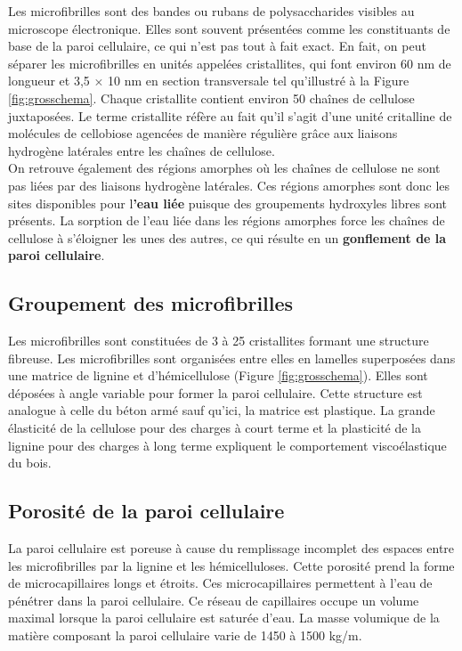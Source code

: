 Les microfibrilles sont des bandes ou rubans de polysaccharides visibles au microscope électronique. Elles sont souvent présentées comme les constituants de base de la paroi cellulaire, ce qui n'est pas tout à fait exact. En fait, on peut séparer les microfibrilles en unités appelées cristallites, qui font environ 60 nm de longueur et 3,5 $\times$ 10 nm en section transversale tel qu'illustré à la Figure \ref{fig:grosschema}. Chaque cristallite contient environ 50 chaînes de cellulose juxtaposées. Le terme cristallite réfère au fait qu'il s'agit d'une unité critalline de molécules de cellobiose agencées de manière régulière grâce aux liaisons hydrogène latérales entre les chaînes de cellulose.\\

On retrouve également des régions amorphes où les chaînes de cellulose ne sont pas liées par des liaisons hydrogène latérales. Ces régions amorphes sont donc les sites disponibles pour l\textbf{'eau liée} puisque des groupements hydroxyles libres sont présents. La sorption de l'eau liée dans les régions amorphes force les chaînes de cellulose à s'éloigner les unes des autres, ce qui résulte en un \textbf{gonflement de la paroi cellulaire}.


\subsection{Groupement des microfibrilles}

Les microfibrilles sont constituées de 3 à 25 cristallites formant une structure fibreuse. Les microfibrilles sont organisées entre elles en lamelles superposées dans une matrice de lignine et d'hémicellulose (Figure \ref{fig:grosschema}). Elles sont déposées à angle variable pour former la paroi cellulaire. Cette structure est analogue à celle du béton armé sauf qu'ici, la matrice est plastique. La grande élasticité de la cellulose pour des charges à court terme et la plasticité de la lignine pour des charges à long terme expliquent le comportement viscoélastique du bois.

\subsection{Porosité de la paroi cellulaire}

La paroi cellulaire est poreuse à cause du remplissage incomplet des espaces entre les microfibrilles par la lignine et les hémicelluloses. Cette porosité prend la forme de microcapillaires longs et étroits. Ces microcapillaires permettent à l'eau de pénétrer dans la paroi cellulaire. Ce réseau de capillaires occupe un volume maximal lorsque la paroi cellulaire est saturée d'eau. La masse volumique de la matière composant la paroi cellulaire varie de 1450 à 1500 kg/m.

